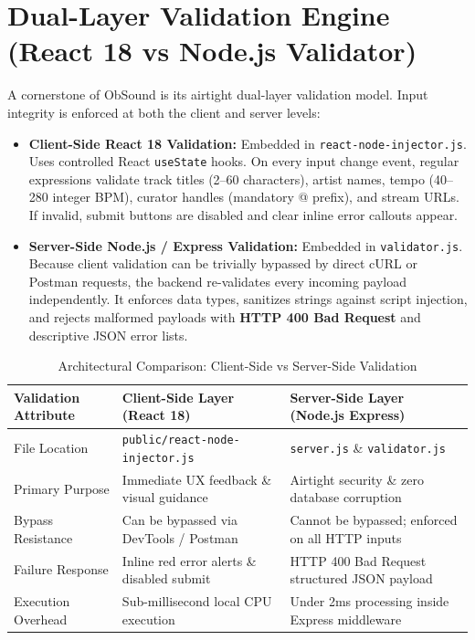 \documentclass[12pt,a4paper,oneside]{report}
\begin{document}
\section{Dual-Layer Validation Engine (React 18 vs Node.js Validator)}
A cornerstone of ObSound is its airtight dual-layer validation model. Input integrity is enforced at both the client and server levels:
\begin{itemize}
    \item \textbf{Client-Side React 18 Validation:} Embedded in \texttt{react-node-injector.js}. Uses controlled React \texttt{useState} hooks. On every input change event, regular expressions validate track titles (2--60 characters), artist names, tempo (40--280 integer BPM), curator handles (mandatory @ prefix), and stream URLs. If invalid, submit buttons are disabled and clear inline error callouts appear.
    \item \textbf{Server-Side Node.js / Express Validation:} Embedded in \texttt{validator.js}. Because client validation can be trivially bypassed by direct cURL or Postman requests, the backend re-validates every incoming payload independently. It enforces data types, sanitizes strings against script injection, and rejects malformed payloads with \textbf{HTTP 400 Bad Request} and descriptive JSON error lists.
\end{itemize}

\begin{table}[H]
\centering
\small
\caption{Architectural Comparison: Client-Side vs Server-Side Validation}
\label{tab:val_comp}
\begin{tabularx}{\textwidth}{lXX}
\toprule
\textbf{Validation Attribute} & \textbf{Client-Side Layer (React 18)} & \textbf{Server-Side Layer (Node.js Express)} \\
\midrule
File Location & \texttt{public/react-node-injector.js} & \texttt{server.js} \& \texttt{validator.js} \\
Primary Purpose & Immediate UX feedback \& visual guidance & Airtight security \& zero database corruption \\
Bypass Resistance & Can be bypassed via DevTools / Postman & Cannot be bypassed; enforced on all HTTP inputs \\
Failure Response & Inline red error alerts \& disabled submit & HTTP 400 Bad Request structured JSON payload \\
Execution Overhead & Sub-millisecond local CPU execution & Under 2ms processing inside Express middleware \\
\bottomrule
\end{tabularx}
\end{table}
\end{document}
